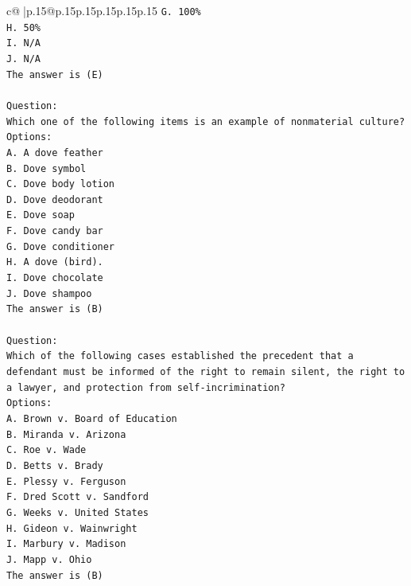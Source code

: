 \documentclass{article}
\begin{document}
{\begin{supertabular}{c@{$\;$}|p{.15\linewidth}@{}p{.15\linewidth}p{.15\linewidth}p{.15\linewidth}p{.15\linewidth}p{.15\linewidth}}
{{{\texttt{G. 100\%} \\
\texttt{H. 50\%} \\
\texttt{I. N/A} \\
\texttt{J. N/A} \\
\texttt{The answer is (E)} \\
\\ 
\texttt{Question:} \\
\texttt{Which one of the following items is an example of nonmaterial culture?} \\
\texttt{Options:} \\
\texttt{A. A dove feather} \\
\texttt{B. Dove symbol} \\
\texttt{C. Dove body lotion} \\
\texttt{D. Dove deodorant} \\
\texttt{E. Dove soap} \\
\texttt{F. Dove candy bar} \\
\texttt{G. Dove conditioner} \\
\texttt{H. A dove (bird).} \\
\texttt{I. Dove chocolate} \\
\texttt{J. Dove shampoo} \\
\texttt{The answer is (B)} \\
\\ 
\texttt{Question:} \\
\texttt{Which of the following cases established the precedent that a defendant must be informed of the right to remain silent, the right to a lawyer, and protection from self{-}incrimination?} \\
\texttt{Options:} \\
\texttt{A. Brown v. Board of Education} \\
\texttt{B. Miranda v. Arizona} \\
\texttt{C. Roe v. Wade} \\
\texttt{D. Betts v. Brady} \\
\texttt{E. Plessy v. Ferguson} \\
\texttt{F. Dred Scott v. Sandford} \\
\texttt{G. Weeks v. United States} \\
\texttt{H. Gideon v. Wainwright} \\
\texttt{I. Marbury v. Madison} \\
\texttt{J. Mapp v. Ohio} \\
\texttt{The answer is (B)} \\
\\ 
}}}
\end{supertabular}}
\end{document}

